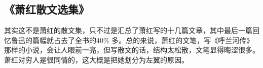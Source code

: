 \subsection{《萧红散文选集》}
其实这不是萧红的散文集，只不过是汇总了萧红写的十几篇文章，其中最后一篇回忆鲁迅的篇幅就占去了全书的40\% 多。总的来说，萧红的文笔，写《呼兰河传》那样的小说，会让人眼前一亮，但写散文的话，结构太松散，文笔显得晦涩很多。萧红对穷人是很同情的，这大概是把她划分为左翼的原因。

